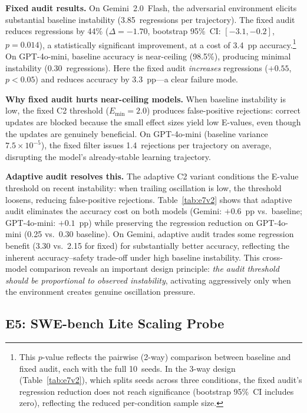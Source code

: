 \documentclass{article}
\begin{document}
\textbf{Fixed audit results.}
On Gemini~2.0~Flash, the adversarial environment elicits substantial
baseline instability (3.85~regressions per trajectory). The fixed
audit reduces regressions by 44\%
($\Delta{=}{-}1.70$, bootstrap 95\%~CI: $[-3.1, -0.2]$, $p{=}0.014$),
a statistically significant improvement, at a cost of 3.4~pp accuracy.\footnote{This $p$-value reflects the pairwise (2-way) comparison between baseline and fixed audit, each with the full 10~seeds. In the 3-way design (Table~\ref{tab:e7v2}), which splits seeds across three conditions, the fixed audit's regression reduction does not reach significance (bootstrap 95\%~CI includes zero), reflecting the reduced per-condition sample size.}
On GPT-4o-mini, baseline accuracy is near-ceiling (98.5\%), producing
minimal instability (0.30~regressions). Here the fixed audit
\emph{increases} regressions ($+0.55$, $p{<}0.05$) and reduces
accuracy by 3.3~pp---a clear failure mode.

\textbf{Why fixed audit hurts near-ceiling models.}
When baseline instability is low, the fixed C2 threshold
($E_{\min}{=}2.0$) produces false-positive rejections: correct
updates are blocked because the small effect sizes yield low
E-values, even though the updates are genuinely beneficial.
On GPT-4o-mini (baseline variance $7.5{\times}10^{-5}$), the
fixed filter issues 1.4~rejections per trajectory on average,
disrupting the model's already-stable learning trajectory.

\textbf{Adaptive audit resolves this.}
The adaptive C2 variant conditions the E-value threshold on recent
instability: when trailing oscillation is low, the threshold loosens,
reducing false-positive rejections. Table~\ref{tab:e7v2} shows
that adaptive audit eliminates the accuracy cost on both models
(Gemini: $+0.6$~pp vs.\ baseline; GPT-4o-mini: $+0.1$~pp)
while preserving the regression reduction on GPT-4o-mini
(0.25 vs.\ 0.30 baseline).
On Gemini, adaptive audit trades some regression benefit
(3.30 vs.\ 2.15 for fixed) for substantially better accuracy,
reflecting the inherent accuracy--safety trade-off under high
baseline instability.
This cross-model comparison reveals an important design principle:
\emph{the audit threshold should be proportional to observed
instability}, activating aggressively only when the environment
creates genuine oscillation pressure.


\subsection{E5: SWE-bench Lite Scaling Probe}
\label{sec:e5}
\end{document}

